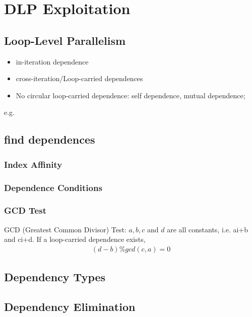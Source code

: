 \newpage
\section{DLP Exploitation}

\subsection{Loop-Level Parallelism}
\begin{itemize}
    \item in-iteration dependence
    \item cross-iteration/Loop-carried dependences
    \item No circular loop-carried dependence:
    self dependence, mutual dependence;
\end{itemize}

e.g. 

\subsection{find dependences}
\subsubsection{Index Affinity}

\subsubsection{Dependence Conditions}

\subsubsection{GCD Test}
GCD (Greatest Common Divisor) Test:
$a, b, c$ and $d$ are all constants, i.e. ai+b and ci+d. If a loop-carried dependence exists,
\begin{align*}
    (d-b)\% gcd(c,a)=0
\end{align*}

\subsection{Dependency Types}


\subsection{Dependency Elimination}